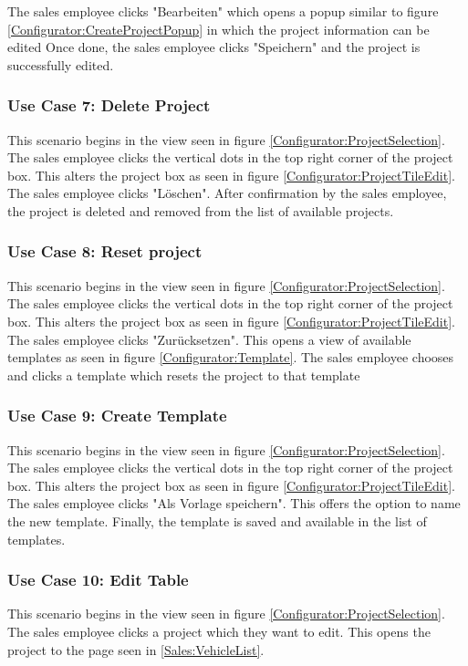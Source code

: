 The sales employee clicks "Bearbeiten" which opens a popup similar to figure \ref{Configurator:CreateProjectPopup} in which the project information can be edited Once done, the sales employee clicks "Speichern" and the project is successfully edited.


\subsubsection{Use Case 7: Delete Project}
This scenario begins in the view seen in figure \ref{Configurator:ProjectSelection}. The sales employee clicks the vertical dots in the top right corner of the project box. This alters the project box as seen in figure \ref{Configurator:ProjectTileEdit}. The sales employee clicks "Löschen". After confirmation by the sales employee, the project is deleted and removed from the list of available projects.


\subsubsection{Use Case 8: Reset project}
This scenario begins in the view seen in figure \ref{Configurator:ProjectSelection}. The sales employee clicks the vertical dots in the top right corner of the project box. This alters the project box as seen in figure \ref{Configurator:ProjectTileEdit}. The sales employee clicks "Zurücksetzen". This opens a view of available templates as seen in figure \ref{Configurator:Template}. The sales employee chooses and clicks a template which resets the project to that template


\subsubsection{Use Case 9: Create Template}
This scenario begins in the view seen in figure \ref{Configurator:ProjectSelection}. The sales employee clicks the vertical dots in the top right corner of the project box. This alters the project box as seen in figure \ref{Configurator:ProjectTileEdit}. The sales employee clicks "Als Vorlage speichern". This offers the option to name the new template. Finally, the template is saved and available in the list of templates.


\subsubsection{Use Case 10: Edit Table}
This scenario begins in the view seen in figure \ref{Configurator:ProjectSelection}. The sales employee clicks a project which they want to edit. This opens the project to the page seen in \ref{Sales:VehicleList}. 

